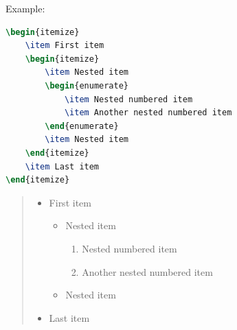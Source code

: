 Example:
\begin{lstlisting}[language=TeX]
\begin{itemize}
    \item First item
    \begin{itemize}
        \item Nested item
        \begin{enumerate}
            \item Nested numbered item
            \item Another nested numbered item
        \end{enumerate}
        \item Nested item
    \end{itemize}
    \item Last item
\end{itemize}
\end{lstlisting}
\begin{quote}
\begin{itemize}
    \item First item
    \begin{itemize}
        \item Nested item
        \begin{enumerate}
            \item Nested numbered item
            \item Another nested numbered item
        \end{enumerate}
        \item Nested item
    \end{itemize}
    \item Last item
\end{itemize}
\end{quote}

